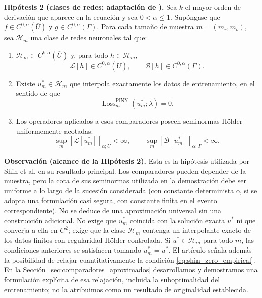 \medskip
\noindent\textbf{Hipótesis 2 (clases de redes; adaptación de \cite[Assumption~3.2]{shin2020convergence}).}
Sea $k$ el mayor orden de derivación que aparece en la ecuación y sea $0<\alpha\leq1$.
Supóngase que $f\in C^{0,\alpha}(\overline U)$ y $g\in C^{0,\alpha}(\Gamma)$. Para cada tamaño de muestra $m=(m_r,m_b)$, sea $\mathcal H_m$ una clase de redes neuronales tal que:
\begin{enumerate}
\item $\mathcal H_m\subset C^{k,\alpha}(\overline U)$ y, para todo $h\in\mathcal H_m$,
\[
\mathcal L[h]\in C^{0,\alpha}(\overline U),
\qquad
\mathcal B[h]\in C^{0,\alpha}(\Gamma).
\]

\item Existe $u_m^*\in\mathcal H_m$ que interpola exactamente los datos de entrenamiento, en el sentido de que
\begin{equation}\label{eq:shin_zero_empirical}
\operatorname{Loss}^{\mathrm{PINN}}_m(u_m^*;\lambda)=0.
\end{equation}

\item Los operadores aplicados a esos comparadores poseen seminormas Hölder uniformemente acotadas:
\begin{equation}\label{eq:shin_comparator_regular}
\sup_m[\mathcal L[u_m^*]]_{\alpha;U}<\infty,
\qquad
\sup_m[\mathcal B[u_m^*]]_{\alpha;\Gamma}<\infty.
\end{equation}
\end{enumerate}

\medskip
\noindent\textbf{Observación (alcance de la Hipótesis 2).}
Esta es la hipótesis utilizada por Shin et al. en su resultado principal.
Los comparadores pueden depender de la muestra, pero la cota de sus
seminormas utilizada en la demostración debe ser uniforme a lo largo
de la sucesión considerada (con constante determinista o, si se adopta
una formulación casi segura, con constante finita en el evento correspondiente).
No se deduce de una aproximación universal sin una construcción adicional. No exige que $u_m^*$ coincida con la solución exacta $u^*$ ni que converja a ella en $C^2$; exige que la clase $\mathcal H_m$ contenga un interpolante exacto de los datos finitos con regularidad Hölder controlada. Si $u^*\in\mathcal H_m$ para todo $m$, las condiciones anteriores se satisfacen tomando $u_m^*=u^*$. El artículo señala además la posibilidad de relajar cuantitativamente la condición \eqref{eq:shin_zero_empirical}. En la Sección~\ref{sec:comparadores_aproximados} desarrollamos y demostramos una formulación explícita de esa relajación, incluida la suboptimalidad del entrenamiento; no la atribuimos como un resultado de originalidad establecida.


